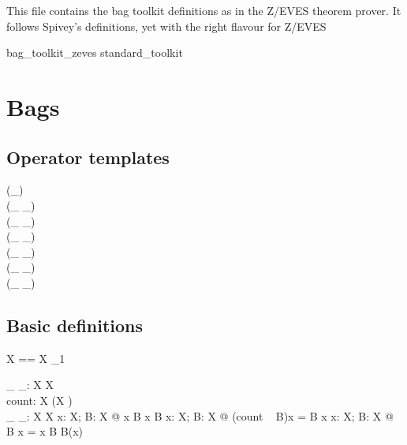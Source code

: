\documentclass[draft,a4paper,10pt,wd]{article}
\begin{document}
This file contains the bag toolkit definitions as in the Z/EVES
theorem prover. It follows Spivey's definitions, yet with the
right flavour for Z/EVES

\begin{zsection}
\SECTION bag\_toolkit\_zeves \parents standard\_toolkit
\end{zsection}

\section{Bags }\label{def-bag}

\subsection*{Operator templates}

\begin{zed}
    \generic (\bag \_) \\
     \leftassoc (\_ \bcount \_) \\
     \leftassoc (\_ \otimes \_) \\
    \relation (\_ \inbag \_) \\
    \relation (\_ \subbageq \_) \\
     \leftassoc (\_ \uplus \_) \\
     \leftassoc (\_ \uminus \_)
\end{zed}

\subsection*{Basic definitions}

\begin{zed}
  \bag X == X \pfun \nat_1
\end{zed}

\begin{gendef}[X]
  \_ \inbag \_: X \rel \bag X \\
  count: \bag X \fun (X \fun \nat) \\
  \_ \bcount \_: \bag X \cross X \fun \nat
\where
  \forall x: X; B: \bag X @ x \inbag B \iff x \in \dom B
\also
  \forall x: X; B: \bag X @ (count ~ B)x = B \bcount x
\also
  \forall x: X; B: \bag X @ B \bcount x = 
    \IF x \inbag B \THEN B(x) 
\end{gendef}
\end{document}
